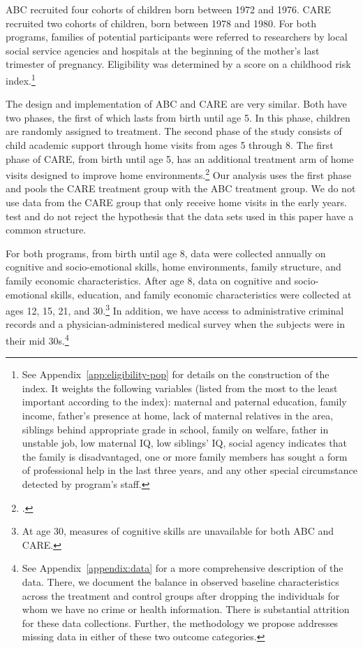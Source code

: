 ABC recruited four cohorts of children born between 1972 and 1976. CARE recruited two cohorts of children, born between 1978 and 1980. For both programs, families of potential participants were referred to researchers by local social service agencies and hospitals at the beginning of the mother's last trimester of pregnancy. Eligibility was determined by a score on a childhood risk index.\footnote{See  Appendix~\ref{app:eligibility-pop} for details on the construction of the index. It weights the following variables (listed from the most to the least important according to the index): maternal and paternal education, family income, father's presence at home, lack of maternal relatives in the area, siblings behind appropriate grade in school, family on welfare, father in unstable job, low maternal IQ, low siblings' IQ, social agency indicates that the family is disadvantaged, one or more family members has sought a form of professional help in the last three years, and any other special circumstance detected by program's staff.}

The design and implementation of ABC and CARE are very similar. Both have two phases, the first of which lasts from birth until age 5. In this phase, children are randomly assigned to treatment. The second phase of the study consists of child academic support through home visits from ages 5 through 8. The first phase of CARE, from birth until age 5, has an additional treatment arm of home visits designed to improve home environments.\footnote{\citet{Wasik_Ramey_etal_1990_CD}.} Our analysis uses the first phase and pools the CARE treatment group with the ABC treatment group. We do not use data from the CARE group that only receive home visits in the early years. \cite{Campbell_Conti_etal_2014_EarlyChildhoodInvestments} test and do not reject the hypothesis that the data sets used in this paper have a common structure.

For both programs, from birth until age 8, data were collected annually on cognitive and socio-emotional skills, home environments, family structure, and family economic characteristics. After age 8, data on cognitive and socio-emotional skills, education, and family economic characteristics were collected at ages 12, 15, 21, and 30.\footnote{At age 30, measures of cognitive skills are unavailable for both ABC and CARE.} In addition, we have access to administrative criminal records and a physician-administered medical survey when the subjects were in their mid 30s.\footnote{See  Appendix~\ref{appendix:data} for a more comprehensive description of the data. There, we document the balance in observed baseline characteristics across the treatment and control groups after dropping the individuals for whom we have no crime or health information. There is substantial attrition for these data collections. Further, the methodology we propose addresses missing data in either of these two outcome categories.}

